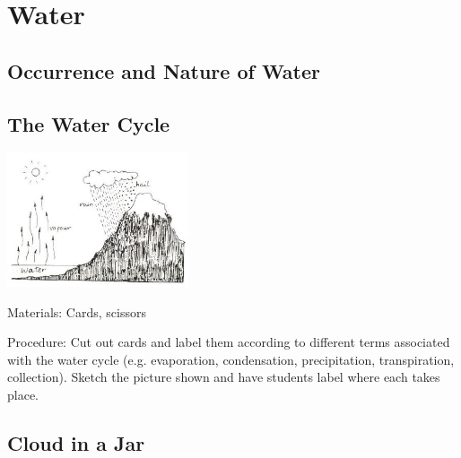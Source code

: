 \section{Water}

\begin{multicols}{2}


\section*{Occurrence and Nature of Water}


\subsection{The Water Cycle}

\begin{center}
\includegraphics[width=0.4\textwidth]{./img/source/water-cycle.jpg}
\end{center}

\begin{description*}
\item[Materials:]{Cards, scissors}
\item[Procedure:]{Cut out cards and label them according to different terms associated with the water cycle (e.g. evaporation, condensation, precipitation, transpiration, collection). Sketch the picture shown and have students label where each takes place.}
\end{description*}

\subsection{Cloud in a Jar}


\end{multicols}

